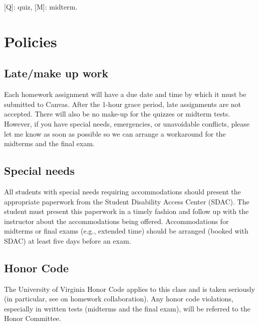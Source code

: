 \documentclass[oneside,11pt]{amsart}
\begin{document}
[Q]: quiz, [M]: midterm.

\section{Policies}

\subsection{Late/make up work} 

Each homework assignment will have a due date and time by which it must be submitted to Canvas.  After the 1-hour grace period, late assignments are not accepted.  There will also be no make-up for the quizzes or midterm tests.  However, if you have special needs, emergencies, or unavoidable conflicts, please let me know as soon as possible so we can arrange a workaround for the midterms and the final exam.

\subsection{Special needs}

All students with special needs requiring accommodations should present the appropriate paperwork from the Student Disability Access Center (SDAC). The student must present this paperwork in a timely fashion and follow up with the instructor about the accommodations being offered.  Accommodations for midterms or final exams (e.g., extended time) should be arranged (booked with SDAC) at least five days before an exam.

\subsection{Honor Code} 

The University of Virginia Honor Code applies to this class and is taken seriously (in particular, see  on homework collaboration).  Any honor code violations, especially in written tests (midterms and the final exam), will be referred to the Honor Committee.
\end{document}
